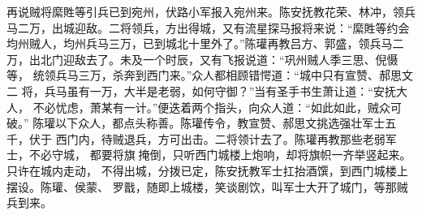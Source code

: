 再说贼将縻貹等引兵已到宛州，伏路小军报入宛州来。陈安抚教花荣、林冲，领兵
马二万，出城迎敌。二将领兵，方出得城，又有流星探马报将来说：“縻貹等约会
均州贼人，均州兵马三万，已到城北十里外了。”陈瓘再教吕方、郭盛，领兵马二
万，出北门迎敌去了。未及一个时辰，又有飞报说道：“巩州贼人季三思、倪慑等，
统领兵马三万，杀奔到西门来。”众人都相顾错愕道：“城中只有宣赞、郝思文二
将，兵马虽有一万，大半是老弱，如何守御？”当有圣手书生萧让道：“安抚大人，
不必忧虑，萧某有一计。”便迭着两个指头，向众人道：“如此如此，贼众可破。”
陈瓘以下众人，都点头称善。陈瓘传令，教宣赞、郝思文挑选强壮军士五千，伏于
西门内，待贼退兵，方可出击。二将领计去了。陈瓘再教那些老弱军士，不必守城，
都要将旗掩倒，只听西门城楼上炮响，却将旗帜一齐举竖起来。只许在城内走动，
不得出城，分拨已定，陈安抚教军士扛抬酒馔，到西门城楼上摆设。陈瓘、侯蒙、
罗戬，随即上城楼，笑谈剧饮，叫军士大开了城门，等那贼兵到来。

